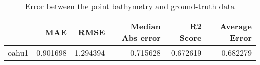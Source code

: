 \begin{table}[h!]
\caption{Error between the point bathymetry and ground-truth data}
\label{tab:oahu1_lidar_error}
\begin{tabular}{lrrrrr}
\toprule
 & MAE & RMSE & Median Abs error & R2 Score & Average Error \\
\midrule
oahu1 & 0.901698 & 1.294394 & 0.715628 & 0.672619 & 0.682279 \\
\bottomrule
\end{tabular}
\end{table}
